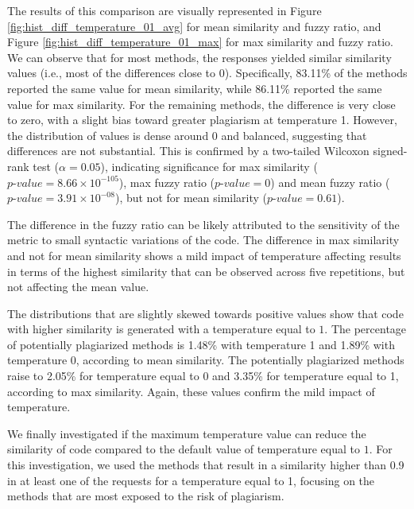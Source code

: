 The results of this comparison are visually represented in Figure \ref{fig:hist_diff_temperature_01_avg} for mean similarity and fuzzy ratio, and Figure \ref{fig:hist_diff_temperature_01_max} for max similarity and fuzzy ratio. We can observe that for most methods, the responses yielded similar similarity values (i.e., most of the differences close to 0). Specifically, 83.11\% of the methods reported the same value for mean similarity, while 86.11\% reported the same value for max similarity. For the remaining methods, the difference is very close to zero, with a slight bias toward greater plagiarism at temperature 1. However, the distribution of values is dense around 0 and balanced, suggesting that differences are not substantial. This is confirmed by a two-tailed Wilcoxon signed-rank test ($\alpha = 0.05$), indicating significance for max similarity ($\textit{p-value} = 8.66 \times 10^{-105}$), max fuzzy ratio ($\textit{p-value} = 0$) and mean fuzzy ratio ($\textit{p-value} = 3.91 \times 10^{-08}$), but not for mean similarity ($\textit{p-value} = 0.61$). 

The difference in the fuzzy ratio can be likely attributed to the sensitivity of the metric to small syntactic variations of the code. The difference in max similarity and not for mean similarity shows a mild impact of temperature affecting results in terms of the highest similarity that can be observed across five repetitions, but not affecting the mean value. 

The distributions that are slightly skewed towards positive values show that code with higher similarity is generated with a temperature equal to $1$. The percentage of potentially plagiarized methods is 1.48\% with temperature 1 and 1.89\% with temperature 0, according to mean similarity. The potentially plagiarized methods raise to 2.05\% for temperature equal to 0 and 3.35\% for temperature equal to 1, according to max similarity. Again, these values confirm the mild impact of temperature. %

We finally investigated if the maximum temperature value can reduce the similarity of code compared to the default value of temperature equal to $1$. For this investigation, we used the methods that result in a similarity higher than 0.9 in at least one of the requests for a temperature equal to 1, focusing on the methods that are most exposed to the risk of plagiarism. 

